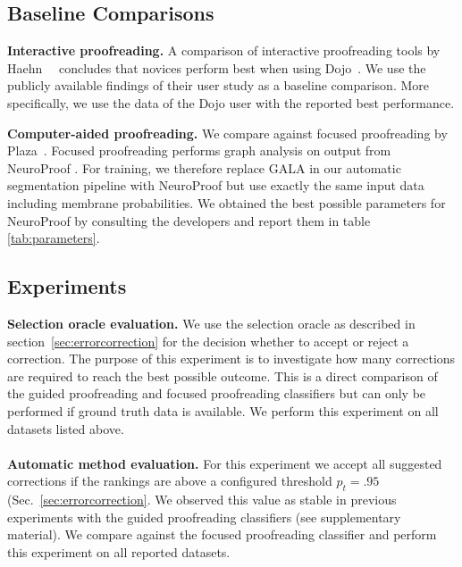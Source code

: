 \subsection{Baseline Comparisons}

\textbf{Interactive proofreading.} A comparison of interactive proofreading tools by Haehn~\etal~ concludes that novices perform best when using Dojo~\cite{haehn_dojo_2014}. We use the publicly available findings of their user study as a baseline comparison. More specifically, we use the data of the Dojo user with the reported best performance.

\textbf{Computer-aided proofreading.} We compare against focused proofreading by Plaza~\cite{focused_proofreading}. Focused proofreading performs graph analysis on output from NeuroProof \cite{neuroproof2013}. For training, we therefore replace GALA in our automatic segmentation pipeline with NeuroProof but use exactly the same input data including membrane probabilities. We obtained the best possible parameters for NeuroProof by consulting the developers and report them in table \ref{tab:parameters}.

\subsection{Experiments}

\textbf{Selection oracle evaluation.} We use the selection oracle as described in section~\ref{sec:errorcorrection} for the decision whether to accept or reject a correction. The purpose of this experiment is to investigate how many corrections are required to reach the best possible outcome. This is a direct comparison of the guided proofreading and focused proofreading classifiers but can only be performed if ground truth data is available. We perform this experiment on all datasets listed above.
\\~\\
\textbf{Automatic method evaluation.} For this experiment we accept all suggested corrections if the rankings are above a configured threshold $p_t=.95$ (Sec.~\ref{sec:errorcorrection}. We observed this value as stable in previous experiments with the guided proofreading classifiers (see supplementary material). We compare against the focused proofreading classifier and perform this experiment on all reported datasets.

